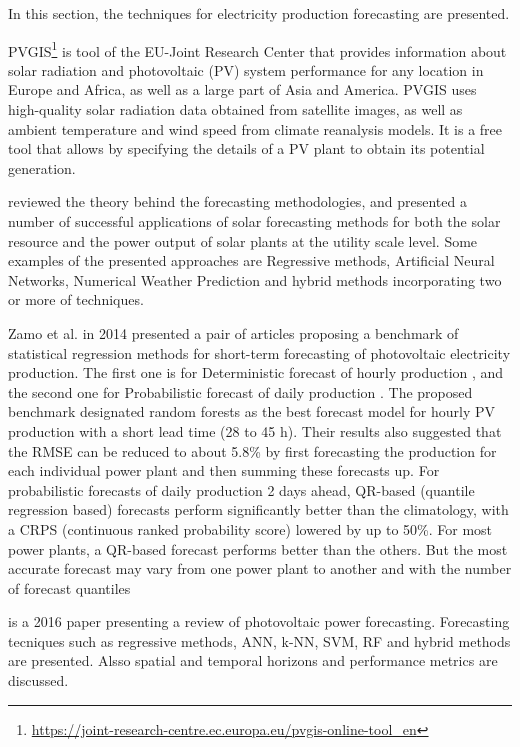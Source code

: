 In this section, the techniques for electricity production forecasting are presented.

PVGIS\footnote{ \url{https://joint-research-centre.ec.europa.eu/pvgis-online-tool_en} } is tool of the EU-Joint Research Center that provides information about solar radiation and photovoltaic (PV) system performance for any location in Europe and Africa, as well as a large part of Asia and America.
PVGIS uses high-quality solar radiation data obtained from satellite images, as well as ambient temperature and wind speed from climate reanalysis models.
It is a free tool that allows by specifying the details of a PV plant to obtain its potential generation.

\cite{INMAN2013535} reviewed the theory behind the forecasting methodologies, and presented a number of successful applications of solar forecasting methods for both the solar resource and the power output of solar plants at the utility scale level.
Some examples of the presented approaches are Regressive methods, Artificial Neural Networks, Numerical Weather Prediction and hybrid methods incorporating two or more of techniques.

Zamo et al. in 2014 presented a pair of articles proposing a benchmark of statistical regression methods for short-term forecasting of photovoltaic electricity production.
The first one is for Deterministic forecast of hourly production \cite{ZAMO2014792}, and the second one for Probabilistic forecast of daily production \cite{ZAMO2014804}.
The proposed benchmark designated random forests as the best forecast model for hourly PV production with a short lead time (28 to 45 h).
Their results also suggested that the RMSE can be reduced to about 5.8\% by first forecasting the production for each individual power plant and then summing these forecasts up.
For probabilistic forecasts of daily production 2 days ahead, QR-based (quantile regression based) forecasts perform significantly better than the climatology, with a CRPS (continuous ranked probability score) lowered by up to 50\%.
For most power plants, a QR-based forecast performs better than the others.
But the most accurate forecast may vary from one power plant to another and with the number of forecast quantiles

\cite{ANTONANZAS201678} is a 2016 paper presenting a review of photovoltaic power forecasting.
Forecasting tecniques such as regressive methods, ANN, k-NN, SVM, RF and hybrid methods are presented.
Alsso spatial and temporal horizons and performance metrics are discussed.

